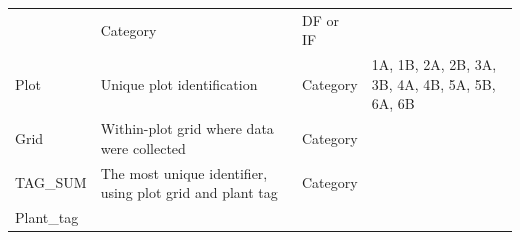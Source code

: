 \documentclass[
  12pt,
]{article}
\begin{document}
\begin{longtable}[]{@{}llll@{}}
\begin{minipage}[t]{0.35\columnwidth}
\end{minipage} & \begin{minipage}[t]{0.18\columnwidth}\raggedright
Category\strut
\end{minipage} & \begin{minipage}[t]{0.18\columnwidth}\raggedright
DF or IF\strut
\end{minipage}\tabularnewline
\begin{minipage}[t]{0.18\columnwidth}\raggedright
Plot\strut
\end{minipage} & \begin{minipage}[t]{0.35\columnwidth}\raggedright
Unique plot identification\strut
\end{minipage} & \begin{minipage}[t]{0.18\columnwidth}\raggedright
Category\strut
\end{minipage} & \begin{minipage}[t]{0.18\columnwidth}\raggedright
1A, 1B, 2A, 2B, 3A, 3B, 4A, 4B, 5A, 5B, 6A, 6B\strut
\end{minipage}\tabularnewline
\begin{minipage}[t]{0.18\columnwidth}\raggedright
Grid\strut
\end{minipage} & \begin{minipage}[t]{0.35\columnwidth}\raggedright
Within-plot grid where data were collected\strut
\end{minipage} & \begin{minipage}[t]{0.18\columnwidth}\raggedright
Category\strut
\end{minipage} & \begin{minipage}[t]{0.18\columnwidth}\raggedright
\strut
\end{minipage}\tabularnewline
\begin{minipage}[t]{0.18\columnwidth}\raggedright
TAG\_SUM\strut
\end{minipage} & \begin{minipage}[t]{0.35\columnwidth}\raggedright
The most unique identifier, using plot grid and plant tag\strut
\end{minipage} & \begin{minipage}[t]{0.18\columnwidth}\raggedright
Category\strut
\end{minipage} & \begin{minipage}[t]{0.18\columnwidth}\raggedright
\strut
\end{minipage}\tabularnewline
\begin{minipage}[t]{0.18\columnwidth}\raggedright
Plant\_tag\strut
\end{minipage} & \begin{minipage}[t]{0.35\columnwidth}\raggedright

\end{minipage}
\end{longtable}
\end{document}
